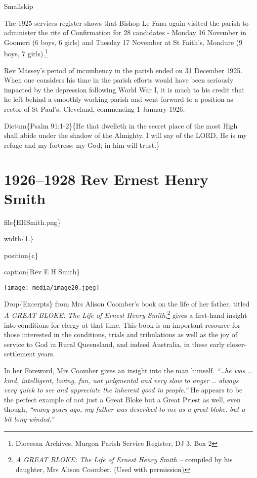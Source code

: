 Smallskip

The 1925 services register shows that Bishop Le Fanu again visited the parish to administer the rite of Confirmation for 28 candidates - Monday 16 November in Goomeri (6 boys, 6 girls) and Tuesday 17 November at St Faith's, Mondure (9 boys, 7 girls).\footnote{Diocesan Archives, Murgon Parish Service Register, DJ 3, Box 2}

Rev Massey's period of incumbency in the parish ended on 31 December 1925. When one considers his time in the parish efforts would have been seriously impacted by the depression following World War I, it is much to his credit that he left behind a smoothly working parish and went forward to a position as rector of St Paul's, Cleveland, commencing 1 January 1926.

Dictum\{Psalm 91:1-2\}\{He that dwelleth in the secret place of the most High shall abide under the shadow of the Almighty. I will say of the LORD, He is my refuge and my fortress: my God; in him will trust.\}

\hypertarget{rev-ernest-henry-smith}{%
\chapter{1926--1928 Rev Ernest Henry Smith}\label{rev-ernest-henry-smith}}

file\{EHSmith.png\}

width\{1.\}

position\{c\}

caption\{Rev E H Smith\}

\texttt{[image: media/image20.jpeg]}

Drop\{Excerpts\} from Mrs Alison Coomber's book on the life of her father, titled \emph{A GREAT BLOKE: The Life of Ernest Henry Smith,}\footnote{\emph{A GREAT BLOKE: The Life of Ernest Henry Smith --} compiled by his daughter, Mrs Alison Coomber. (Used with permission)} gives a first-hand insight into conditions for clergy at that time. This book is an important resource for those interested in the conditions, trials and tribulations as well as the joy of service to God in Rural Queensland, and indeed Australia, in these early closer-settlement years.

In her Foreword, Mrs Coomber gives an insight into the man himself. \emph{``\ldots he was \ldots{} kind, intelligent, loving, fun, not judgmental and very slow to anger \ldots{} always very quick to see and appreciate the inherent good in people.''} He appears to be the perfect example of not just a Great Bloke but a Great Priest as well, even though, \emph{``many years ago, my father was described to me as a great bloke, but a bit long-winded.''}

